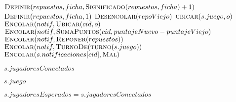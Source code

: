 \begin{algorithm}[H]
    \begin{algorithmic}[1]
            \State{}
            \State{}
            \State{}
                \State{}
                    \State$\textsc{Definir}(repuestos,ficha,\textsc{Significado}(repuestos,ficha)+1)$
                \Else
                    \State$\textsc{Definir}(repuestos,ficha,1)$
                \EndIf
                \State$\textsc{Desencolar}(repoViejo)$
            \EndFor
            \State{}
            \State$\textsc{ubicar}(s.juego,o)$
            \State{}
                \State{}
                \State$\textsc{Encolar}(notif,\textsc{Ubicar}(cid,o)$
                \State$\textsc{Encolar}(notif,\textsc{SumaPuntos}(cid,puntajeNuevo-puntajeViejo)$
                    \State$\textsc{Encolar}(notif,\textsc{Reponer}(repuestos))$
                \EndIf
                \State$\textsc{Encolar}(notif,\textsc{TurnoDe}(\textsc{turno}(s.juego))$
            \EndFor
        \Else
            \State$\textsc{Encolar}(s.notificaciones[cid],\textsc{Mal})$
        \EndIf
    \end{algorithmic}
\end{algorithm}

\begin{algorithm}[H]
    \begin{algorithmic}[1]
        \State\Return$s.jugadoresConectados$
    \end{algorithmic}
\end{algorithm}

\begin{algorithm}[H]
    \begin{algorithmic}[1]
        \State\Return$s.juego$
    \end{algorithmic}
\end{algorithm}

\begin{algorithm}[H]
    \begin{algorithmic}[1]
        \State\Return$s.jugadoresEsperados=s.jugadoresConectados$
    \end{algorithmic}
\end{algorithm}
\newpage

